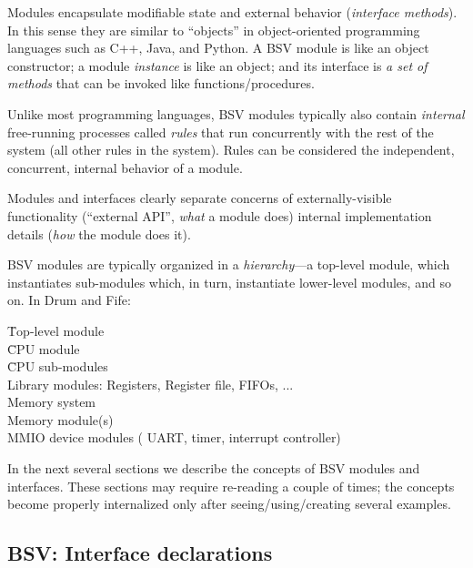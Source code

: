 Modules encapsulate modifiable state and external behavior
(\emph{interface methods}).  In this sense they are similar to
``objects'' in object-oriented programming languages such as C++,
Java, and Python.  A BSV module is like an object constructor; a
module \emph{instance} is like an object; and its interface is \emph{a
set of methods} that can be invoked like functions/procedures.

Unlike most programming languages, BSV modules typically also contain
\emph{internal} free-running processes called \emph{rules} that run
concurrently with the rest of the system (all other rules in the
system).  Rules can be considered the independent, concurrent,
internal behavior of a module.

Modules and interfaces clearly separate concerns of externally-visible
functionality (``external API'', \emph{what} a module does) {\vs}
internal implementation details (\emph{how} the module does it).

BSV modules are typically organized in a \emph{hierarchy}---a top-level module, which instantiates sub-modules which, in turn, instantiate lower-level modules, and so on.
In Drum and Fife:
\begin{tabbing}
\hmm \= Top-level module \\
     \> \hmm \= CPU module \\
     \>      \> \hmm \= CPU sub-modules \\
     \>      \>      \> \hmm Library modules: Registers, Register file, FIFOs, ... \\
     \>      \> Memory system \\
     \>      \>      \> Memory module(s) \\
     \>      \>      \> MMIO device modules ({\eg} UART, timer, interrupt controller)
\end{tabbing}

In the next several sections we describe the concepts of BSV modules
and interfaces.  These sections may require re-reading a couple of
times; the concepts become properly internalized only after
seeing/using/creating several examples.


\subsection{BSV: Interface declarations}


